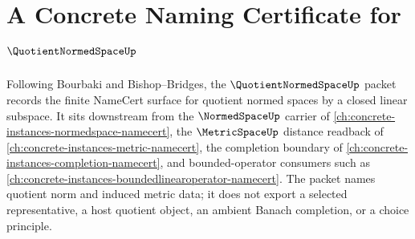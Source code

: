 \chapter{A Concrete Naming Certificate for $\QuotientNormedSpaceUp$}
\label{ch:concrete-instances-quotient-normed-space-namecert}

Following Bourbaki and Bishop--Bridges, the $\QuotientNormedSpaceUp$ packet records the finite NameCert surface for quotient normed spaces by a closed linear subspace. It sits downstream from the $\NormedSpaceUp$ carrier of \autoref{ch:concrete-instances-normedspace-namecert}, the $\MetricSpaceUp$ distance readback of \autoref{ch:concrete-instances-metric-namecert}, the completion boundary of \autoref{ch:concrete-instances-completion-namecert}, and bounded-operator consumers such as \autoref{ch:concrete-instances-boundedlinearoperator-namecert}. The packet names quotient norm and induced metric data; it does not export a selected representative, a host quotient object, an ambient Banach completion, or a choice principle.

